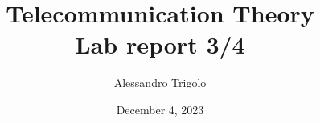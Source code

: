 \title{\vspace{160px} \textbf{\huge{Telecommunication Theory}} \\\vspace{17.5px} \LARGE{Lab report 3/4}  \vspace{10px}}
\author{Alessandro Trigolo}
\date{December 4, 2023}


\maketitle \newpage








